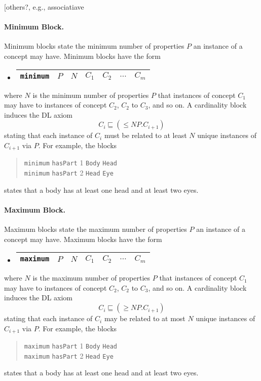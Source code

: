 \documentclass[11pt,onecolumn]{article}
\begin{document}
[others?, e.g., associatiave

\paragraph{Minimum Block.} Minimum blocks state the minimum
number of properties $P$ an instance of a concept may have.
Minimum blocks have the form
\begin{itemize}
\item[]
  \begin{tabular}{|l|l|l|l|l|l|l|}\hline \texttt{minimum} & $P$ & $N$ & 
    $C_1$ & $C_2$ & $\dots$ & $C_m$
    \\ \hline
  \end{tabular}
\end{itemize}
where $N$ is the minimum number of properties $P$ that instances of
concept $C_1$ may have to instances of concept $C_2$, $C_2$ to $C_3$,
and so on. A cardinality block induces the DL axiom \[C_i \sqsubseteq
(\le N P.C_{i+1})\] stating that each instance of $C_i$ must be related to
at least $N$ unique instances of $C_{i+1}$ via $P$. For example, the blocks
\begin{quote}
\texttt{minimum} \texttt{hasPart} 1 \texttt{Body} \texttt{Head} \\
\texttt{minimum} \texttt{hasPart} 2 \texttt{Head} \texttt{Eye}
\end{quote}
states that a body has at least one head and at least two eyes.

\paragraph{Maximum Block.} Maximum blocks state the maximum
number of properties $P$ an instance of a concept may have.
Maximum blocks have the form
\begin{itemize}
\item[]
  \begin{tabular}{|l|l|l|l|l|l|l|}\hline \texttt{maximum} & $P$ & $N$ & 
    $C_1$ & $C_2$ & $\dots$ & $C_m$
    \\ \hline
  \end{tabular}
\end{itemize}
where $N$ is the maximum number of properties $P$ that instances of
concept $C_1$ may have to instances of concept $C_2$, $C_2$ to $C_3$,
and so on. A cardinality block induces the DL axiom \[C_i \sqsubseteq
(\ge N P.C_{i+1})\] stating that each instance of $C_i$ may be related to
at most $N$ unique instances of $C_{i+1}$ via $P$. For example, the blocks
\begin{quote}
\texttt{maximum} \texttt{hasPart} 1 \texttt{Body} \texttt{Head} \\
\texttt{maximum} \texttt{hasPart} 2 \texttt{Head} \texttt{Eye}
\end{quote}
states that a body has at least one head and at least two eyes.
\end{document}
